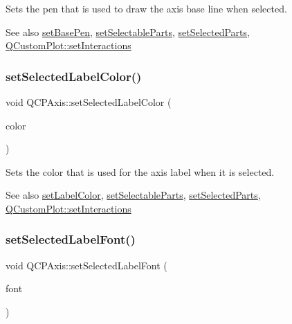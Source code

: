 Sets the pen that is used to draw the axis base line when selected.

\begin{DoxySeeAlso}{See also}
\mbox{\hyperlink{class_q_c_p_axis_a778d45fb71b3c7ab3bb7079e18b058e4}{set\+Base\+Pen}}, \mbox{\hyperlink{class_q_c_p_axis_a513f9b9e326c505d9bec54880031b085}{set\+Selectable\+Parts}}, \mbox{\hyperlink{class_q_c_p_axis_ab9d7a69277dcbed9119b3c1f25ca19c3}{set\+Selected\+Parts}}, \mbox{\hyperlink{class_q_custom_plot_a5ee1e2f6ae27419deca53e75907c27e5}{Q\+Custom\+Plot\+::set\+Interactions}} 
\end{DoxySeeAlso}
\mbox{\label{class_q_c_p_axis_a5d502dec597c634f491fdd73d151c72d}} 
\subsubsection{\texorpdfstring{setSelectedLabelColor()}{setSelectedLabelColor()}}
{\footnotesize\ttfamily void Q\+C\+P\+Axis\+::set\+Selected\+Label\+Color (\begin{DoxyParamCaption}\item[{const Q\+Color \&}]{color }\end{DoxyParamCaption})}

Sets the color that is used for the axis label when it is selected.

\begin{DoxySeeAlso}{See also}
\mbox{\hyperlink{class_q_c_p_axis_a6c906fe56d75f0122335b9f79b999608}{set\+Label\+Color}}, \mbox{\hyperlink{class_q_c_p_axis_a513f9b9e326c505d9bec54880031b085}{set\+Selectable\+Parts}}, \mbox{\hyperlink{class_q_c_p_axis_ab9d7a69277dcbed9119b3c1f25ca19c3}{set\+Selected\+Parts}}, \mbox{\hyperlink{class_q_custom_plot_a5ee1e2f6ae27419deca53e75907c27e5}{Q\+Custom\+Plot\+::set\+Interactions}} 
\end{DoxySeeAlso}
\mbox{\label{class_q_c_p_axis_a02ec2a75d4d8401eaab834fbc6803d30}} 
\subsubsection{\texorpdfstring{setSelectedLabelFont()}{setSelectedLabelFont()}}
{\footnotesize\ttfamily void Q\+C\+P\+Axis\+::set\+Selected\+Label\+Font (\begin{DoxyParamCaption}\item[{const Q\+Font \&}]{font }\end{DoxyParamCaption})}

